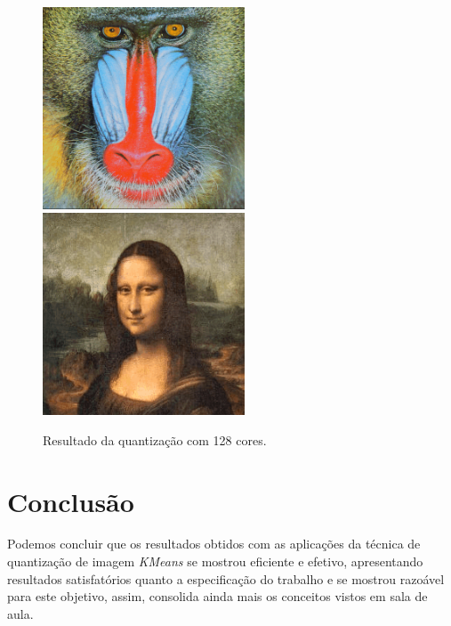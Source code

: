 \documentclass[twoside,twocolumn]{article}
\begin{document}
\begin{figure}[h]
\begin{center}
	\includegraphics[height=6cm]{figures/baboon_128.png} \quad
	\includegraphics[height=6cm]{figures/monalisa_128.png}
\caption{Resultado da quantização com 128 cores.} \label{quant_128}
\end{center}
\end{figure}


\section{Conclusão}

Podemos concluir que os resultados obtidos com as aplicações da técnica de quantização de imagem \textit{KMeans} se mostrou eficiente e efetivo, apresentando resultados satisfatórios quanto a especificação do trabalho e se mostrou razoável para este objetivo, assim, consolida ainda mais os conceitos vistos em sala de aula.

\end{document}
